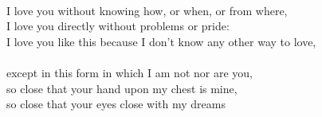 \begin{Parallel}{0.48\textwidth}{0.48\textwidth}
{\-\ \\ I love you without knowing how, or when, or from where,\\
I love you directly without problems or pride:\\
I love you like this because I don’t know any other way to love,\\

\-\ \\ except in this form in which I am not nor are you,\\
so close that your hand upon my chest is mine,\\
so close that your eyes close with my dreams}
\ParallelPar
\end{Parallel}
\vfill
\hspace{0pt}